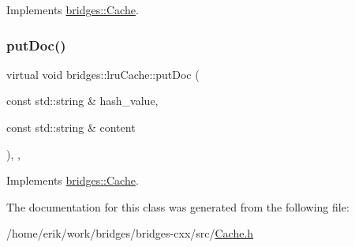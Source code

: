 Implements \hyperlink{classbridges_1_1_cache_abf3601225841d14dcd5611cd6a223ba4}{bridges\+::\+Cache}.

\mbox{\label{classbridges_1_1lru_cache_a927fa1186ba830717ce11898c2beb4c7}} 
\subsubsection{\texorpdfstring{put\+Doc()}{putDoc()}}
{\footnotesize\ttfamily virtual void bridges\+::lru\+Cache\+::put\+Doc (\begin{DoxyParamCaption}\item[{const std\+::string \&}]{hash\+\_\+value,  }\item[{const std\+::string \&}]{content }\end{DoxyParamCaption})\hspace{0.3cm}{\ttfamily [inline]}, {\ttfamily [override]}, {\ttfamily [virtual]}}



Implements \hyperlink{classbridges_1_1_cache_ae74225542568a377fdcaf0354e466954}{bridges\+::\+Cache}.



The documentation for this class was generated from the following file\+:\begin{DoxyCompactItemize}
\item 
/home/erik/work/bridges/bridges-\/cxx/src/\hyperlink{_cache_8h}{Cache.\+h}\end{DoxyCompactItemize}
